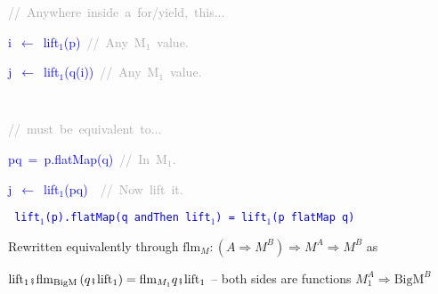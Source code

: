 {\footnotesize{}\vspace{-0.2cm}\hspace{-0.0cm}}\texttt{\textcolor{blue}{\footnotesize{}}}%
\begin{minipage}[t]{0.58\columnwidth}%
\begin{lyxcode}
\textrm{\textcolor{darkgray}{\footnotesize{}//~Anywhere~inside~a~for/yield,~this...}}{\footnotesize\par}

\textcolor{blue}{\footnotesize{}i~$\leftarrow$~lift$_{1}$(p)~}\textrm{\textcolor{darkgray}{\footnotesize{}//~Any~M$_{1}$~value.}}{\footnotesize\par}

\textcolor{blue}{\footnotesize{}j~$\leftarrow$~lift$_{1}$(q(i))~}\textrm{\textcolor{darkgray}{\footnotesize{}//~Any~M$_{1}$~value.}}{\footnotesize\par}
\end{lyxcode}
%
\end{minipage}\texttt{\textcolor{blue}{\footnotesize{}~ }}%
\begin{minipage}[t]{0.5\columnwidth}%
\begin{lyxcode}
\textrm{\textcolor{darkgray}{\footnotesize{}//~must~be~equivalent~to...}}{\footnotesize\par}

\textcolor{blue}{\footnotesize{}pq~=~p.flatMap(q)~}\textrm{\textcolor{darkgray}{\footnotesize{}//~In~M$_{1}$.}}{\footnotesize\par}

\textcolor{blue}{\footnotesize{}j~$\leftarrow$~lift$_{1}$(pq)}\textrm{\textcolor{darkgray}{\footnotesize{}~~//~Now~lift~it.}}{\footnotesize\par}
\end{lyxcode}
%
\end{minipage}\texttt{\textcolor{blue}{\footnotesize{}\medskip{}
lift$_{1}$(p).flatMap(q andThen lift$_{1}$) = lift$_{1}$(p flatMap
q)}}{\footnotesize\par}

Rewritten equivalently through {\footnotesize{}$\text{flm}_{M}:\left(A\Rightarrow M^{B}\right)\Rightarrow M^{A}\Rightarrow M^{B}$}
as
\begin{center}
{\footnotesize{}\vspace{-0.2cm}\hspace{-0.0cm}$\text{lift}_{1}\bef\text{flm}_{\text{BigM}}\left(q\bef\text{lift}_{1}\right)=\text{flm}_{M_{1}}q\bef\text{lift}_{1}$
– both sides are functions $M_{1}^{A}\Rightarrow\text{BigM}^{B}$}{\footnotesize\par}
\par\end{center}

